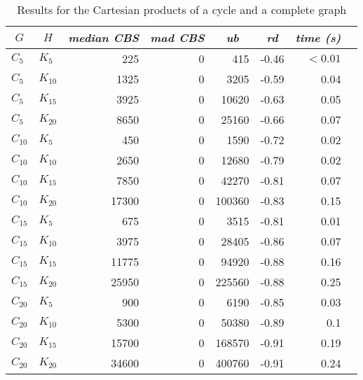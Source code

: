 \documentclass{scrartcl}
\theoremstyle{plain}
\newcommand{\cbs}{CBS}
\begin{document}
\begin{table}[!ht]
	\centering
	\scriptsize
	\begin{tabular}{|ll|rr|r|r|r|r|} 
	\hline
	\multicolumn{1}{|c}{$G$} &
	\multicolumn{1}{c|}{$H$} &
	\multicolumn{1}{c}{\emph{median \cbs{}}} &
	\multicolumn{1}{c|}{\emph{mad \cbs{}}} &
	\multicolumn{1}{c|}{\emph{ub}} &
	\multicolumn{1}{c|}{\emph{rd}} &
	\multicolumn{1}{c|}{\emph{time (s)}} \\ \hline
		
	\makeatletter{}$C_{5}$ & $K_{5}$ & 225 & 0 & 415 & -0.46 & $<0.01$ \\ 
$C_{5}$ & $K_{10}$ & 1325 & 0 & 3205 & -0.59 & 0.04 \\ 
$C_{5}$ & $K_{15}$ & 3925 & 0 & 10620 & -0.63 & 0.05 \\ 
$C_{5}$ & $K_{20}$ & 8650 & 0 & 25160 & -0.66 & 0.07 \\ 
$C_{10}$ & $K_{5}$ & 450 & 0 & 1590 & -0.72 & 0.02 \\ 
$C_{10}$ & $K_{10}$ & 2650 & 0 & 12680 & -0.79 & 0.02 \\ 
$C_{10}$ & $K_{15}$ & 7850 & 0 & 42270 & -0.81 & 0.07 \\ 
$C_{10}$ & $K_{20}$ & 17300 & 0 & 100360 & -0.83 & 0.15 \\ 
$C_{15}$ & $K_{5}$ & 675 & 0 & 3515 & -0.81 & 0.01 \\ 
$C_{15}$ & $K_{10}$ & 3975 & 0 & 28405 & -0.86 & 0.07 \\ 
$C_{15}$ & $K_{15}$ & 11775 & 0 & 94920 & -0.88 & 0.16 \\ 
$C_{15}$ & $K_{20}$ & 25950 & 0 & 225560 & -0.88 & 0.25 \\ 
$C_{20}$ & $K_{5}$ & 900 & 0 & 6190 & -0.85 & 0.03 \\ 
$C_{20}$ & $K_{10}$ & 5300 & 0 & 50380 & -0.89 & 0.1 \\ 
$C_{20}$ & $K_{15}$ & 15700 & 0 & 168570 & -0.91 & 0.19 \\ 
$C_{20}$ & $K_{20}$ & 34600 & 0 & 400760 & -0.91 & 0.24 \\ 
 
	
	\hline
	\end{tabular}
	\caption{\label{tab:cart_ck_perf}Results for the Cartesian products of a 
cycle and a complete 
graph}

\end{table}
\end{document}
